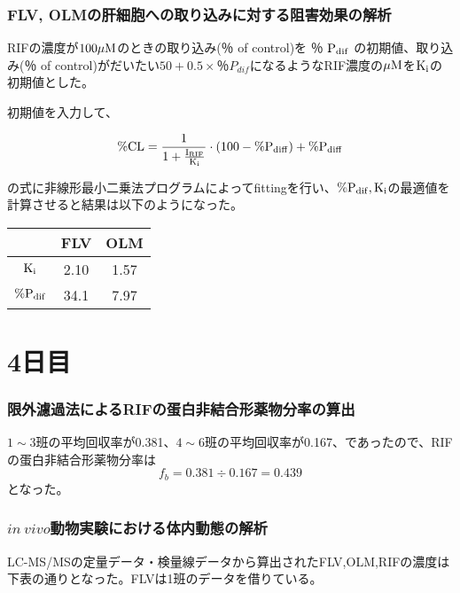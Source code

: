 \documentclass[a4paper,papersize,dvipdfmx]{jsarticle}
\begin{document}
\section*{FLV, OLMの肝細胞への取り込みに対する阻害効果の解析}

RIFの濃度が$\rm 100\mu M$のときの取り込み(％ of control)を ％ $\rm P_{dif}$ の初期値、取り込み(％ of control)がだいたい$50 + 0.5 \times ％P_{dif}$になるようなRIF濃度の$\rm \mu M$を$\rm K_i$の初期値とした。

初期値を入力して、

\[\rm \%CL = \frac{1}{1+\frac{I_{RIF}}{K_i}}\cdot \left( 100 - \%P_{diff} \right) + \%P_{diff} \]

の式に非線形最小二乗法プログラムによってfittingを行い、$\rm \%P_{dif}, K_i$の最適値を計算させると結果は以下のようになった。

\begin{table}[H]
\begin{center}
\begin{tabular}{|c|c|c|}
\hline
& FLV    & OLM        \\ \hline
$\rm K_i$     & 2.10 & 1.57 \\ \hline
$\rm \%P_{dif}$ & 34.1 & 7.97 \\ \hline
\end{tabular}
\end{center}
\end{table}

\part*{4日目}

\section*{限外濾過法によるRIFの蛋白非結合形薬物分率の算出}

$1 \sim 3$班の平均回収率が0.381、$4 \sim 6$班の平均回収率が0.167、であったので、RIFの蛋白非結合形薬物分率は
\[f_b = 0.381 \div 0.167 =0.439\]
となった。

\section*{$in \ vivo$動物実験における体内動態の解析}

LC-MS/MSの定量データ・検量線データから算出されたFLV,OLM,RIFの濃度は下表の通りとなった。FLVは1班のデータを借りている。
\end{document}
